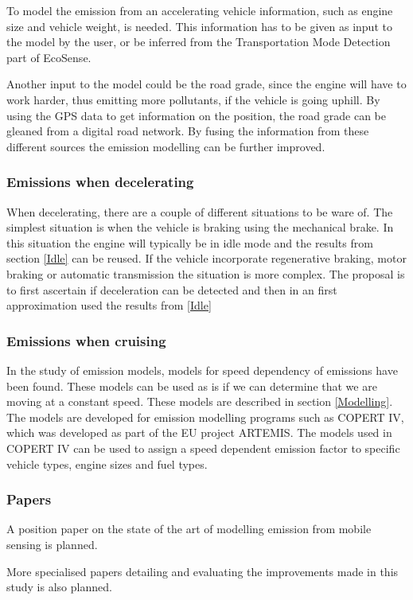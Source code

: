 To model the emission from an accelerating vehicle information, such as engine size and vehicle weight, is needed. This information has to be given as input to the model by the user, or be inferred from the Transportation Mode Detection part of EcoSense.

Another input to the model could be the road grade, since the engine will have to work harder, thus emitting more pollutants, if the vehicle is going uphill. By using the GPS data to get information on the position, the road grade can be gleaned from a digital road network. By fusing the information from these different sources the emission modelling  can be further improved.  

\subsubsection{Emissions when decelerating}
When decelerating, there are a couple of different situations to be ware of. The simplest situation is when the vehicle is braking using the mechanical brake. In this situation the engine will typically be in idle mode and the results from section \ref{Idle} can be reused. If the vehicle incorporate regenerative braking, motor braking or automatic transmission the situation is more complex. The proposal is to first ascertain if deceleration can be detected and then in an first approximation used the results from \ref{Idle}

\subsubsection{Emissions when cruising}
In the study of emission models, models for speed dependency of emissions have been found. These models can be used as is if we can determine that we are moving at a constant speed. These models are described in section \ref{Modelling}. The models are developed for emission modelling programs such as COPERT IV, which was developed as part of the EU project ARTEMIS. The models used in COPERT IV can be used to assign a speed dependent emission factor to specific vehicle types, engine sizes and fuel types.
 
\subsubsection{Papers}
A position paper on the state of the art of modelling emission from mobile sensing is planned.

More specialised papers detailing and evaluating the improvements made in this study is also planned.

